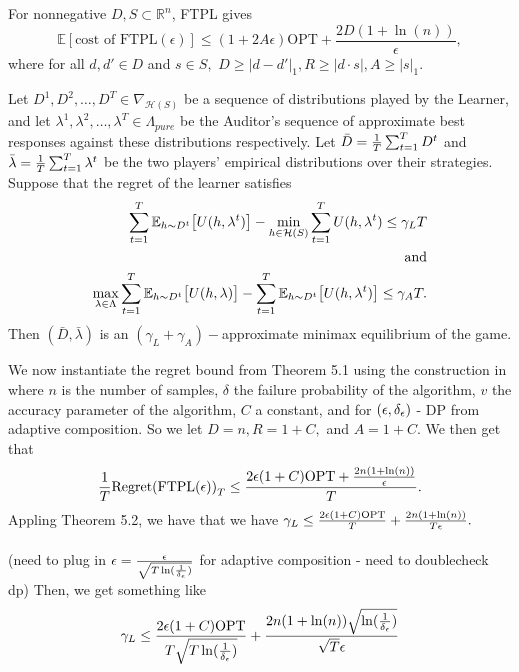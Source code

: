 \begin{theorem}
  [ \vg{ref KV} ] For nonnegative $D, S \subset \mathbb{R}^n$, FTPL gives
  \[ \mathbb{E}[\text{cost of FTPL}(\epsilon)] \leq
  (1 + 2A \epsilon) \text{OPT} + \frac{2D(1 + \ln(n))}{\epsilon }, \]
  where for all $d, d' \in D$ and $s \in S,$
  $D \geq |d - d'|_1, R \geq |d \cdot s|, A \geq |s|_1$.
\end{theorem}
%
\begin{theorem}
   Let $D^1, D^2, \ldots, D^T \in \nabla_{\mathcal{H}(S)}$
  be a sequence of distributions played by the Learner, and let $\lambda^1, \lambda^2, \ldots, \lambda^T \in \Lambda_{pure}$
  be the Auditor's sequence of approximate best responses against these distributions respectively.
  Let $\bar D = \frac{1}{T} \sum_{t=1}^T D^t$ and $\bar \lambda = \frac{1}{T} \sum_{t=1}^T \lambda^t$
  be the two players' empirical distributions over their strategies. Suppose that the regret of the learner satisfies
  \begin{align*}
    \sum_{t=1}^T \mathbb{E}_{h \sim D^t}\big[ U(h, \lambda^t)\big] -
     \min_{h \in \mathcal{H}(S)} \sum_{t=1}^T U(h, \lambda^t) \leq \gamma_L T \\
     \text{and} \\
     \max_{\lambda \in \Lambda} \sum_{t=1}^T \mathbb{E}_{h \sim D^t}\big[ U(h, \lambda)\big] -
     \sum_{t=1}^T \mathbb{E}_{h \sim D^t}\big[ U(h, \lambda^t)\big] \leq \gamma_A T.
  \end{align*}
  Then $(\bar D, \bar \lambda)$ is an $(\gamma_L + \gamma_A)-$approximate minimax equilibrium of the game.
\end{theorem}
%
We now instantiate the regret bound from Theorem 5.1 using the construction in  where $n$ is the number of samples, $\delta$ the failure probability of the algorithm, $v$ the accuracy parameter of the algorithm, $C$ a constant, and for $(\epsilon, \delta_\epsilon)$ - DP from adaptive composition. So we let $D = n, R = 1 + C,$ and $A = 1 + C$.
%
We then get that
\[ \frac{1}{T}\text{Regret(FTPL($\epsilon$))}_T \leq \frac{2\epsilon(1+C)\text{OPT} + \frac{2n(1+\ln(n))}{\epsilon}}{T}.
\]
%
Appling Theorem 5.2, we have that we have $\gamma_L \leq
\frac{2\epsilon(1+C)\text{OPT}}{T} + \frac{2n(1+\ln(n))}{T\epsilon}.$
%
\\ \\
(need to plug in $\epsilon = \frac{\epsilon}{\sqrt{T\ln(\frac{1}{\delta_\epsilon})}}$ for adaptive composition - need to doublecheck dp)
Then, we get something like
\[
\gamma_L \leq
\frac{2\epsilon(1+C)\text{OPT}}{T\sqrt{T\ln(\frac{1}{\delta_\epsilon})}} + \frac{2n(1+\ln(n))\sqrt{\ln(\frac{1}{\delta_\epsilon})}}{\sqrt{T}\epsilon}
\]
